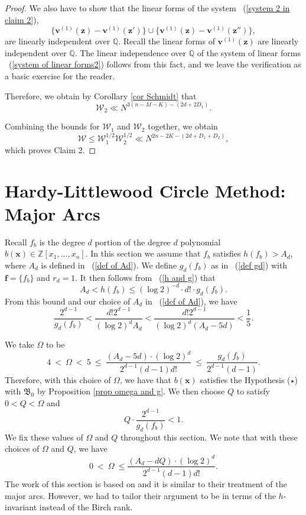 \documentclass[12pt]{amsart}
\theoremstyle{definition}
\theoremstyle{remark}
\numberwithin{equation}{section}
\begin{document}
\begin{proof}
We also have to show that the linear forms of the system ~(\ref{system 2 in claim 2}),
\begin{equation}
\label{system of linear forms2}
\{ \mathbf{v}^{(1)}(\mathbf{z}) - \mathbf{v}^{(1)}(\mathbf{z}') \} \cup \{ \mathbf{v}^{(1)}(\mathbf{z}) - \mathbf{v}^{(1)}(\mathbf{z}'') \},
\end{equation}
are linearly independent over $\mathbb{Q}$.
Recall the linear forms of $\mathbf{v}^{(1)}(\mathbf{z})$ are linearly independent over $\mathbb{Q}$.
The linear independence over $\mathbb{Q}$ of the system of linear forms ~(\ref{system of linear forms2}) follows from this fact, and we leave the verification
as a basic exercise for the reader.

Therefore, we obtain by Corollary \ref{cor Schmidt} that
$$
\mathcal{W}_2 \ll N^{3(n -M - K) - (2 d + 2 D_1)}.
$$

Combining the bounds for $\mathcal{W}_1$ and $\mathcal{W}_2$ together, we obtain
$$
\mathcal{W} \leq \mathcal{W}_1^{1/2} \mathcal{W}_2^{1/2} \ll N^{2n -2 K - (2d + D_1 + D_2)},
$$
which proves Claim 2.
\end{proof}

\section{Hardy-Littlewood Circle Method: Major Arcs}
\label{section major arcs}
Recall $f_b$ is the degree $d$ portion of the degree $d$ polynomial $b(\mathbf{x}) \in \mathbb{Z}[x_1, ..., x_n]$.
In this section we assume that $f_b$ satisfies $h(f_b) > A_d$, where $A_d$ is defined in ~(\ref{def of Ad}).
We define $g_d(f_b)$ as in ~(\ref{def gd}) with $\mathbf{f} = \{ f_b \}$ and $r_d = 1$.
It then follows from ~(\ref{h and g}) 
that
$$
A_d < h(f_b) \leq (\log 2)^{-d} \cdot d! \cdot g_d(f_b).
$$
From this bound and our choice of $A_d$ in ~(\ref{def of Ad}), we have
\begin{equation}
\label{g and h}
\frac{ 2^{d-1}}{g_d(f_b)} < \frac{d!  2^{d-1} }{(\log 2)^d A_d} < \frac{d! 2^{d-1} }{(\log 2)^d (A_d - 5d) } < \frac{1}{5}.
\end{equation}

We take $\Omega$ to be
$$
4 \ < \ \Omega  \ < \ 5 \ \leq  \ \frac{(A_d - 5 d) \cdot  (\log 2)^{d}}{ 2^{d-1} (d-1) d! } \ \leq \  \frac{g_d(f_b)}{ 2^{d-1} (d-1)}.
$$
Therefore, with this choice of $\Omega$, we have that $b(\mathbf{x})$ satisfies the Hypothesis ($\star$) with $\mathfrak{B}_0$ by Proposition \ref{prop omega and g}.
We then choose $Q$ to satisfy $0 < Q < \Omega$ and
\begin{equation}
\label{Q bound 1}
Q \cdot \frac{ 2^{d-1}}{g_d(f_b)} < 1.
\end{equation}
We fix these values of $\Omega$ and $Q$ throughout this section.
We note that with these choices of $\Omega$ and $Q$, we have
\begin{equation}
\label{omega bound 2}
0 \ < \ \Omega \  \leq \frac{ (A_d - d Q) \cdot  (\log 2)^{d}}{ 2^{d-1} (d-1) d! }.
\end{equation}
The work of this section is based on \cite{CM} and it is similar to their treatment of
the major arcs. However, we had to tailor their argument to be in terms of the $h$-invariant instead of the Birch rank.
\end{document}
